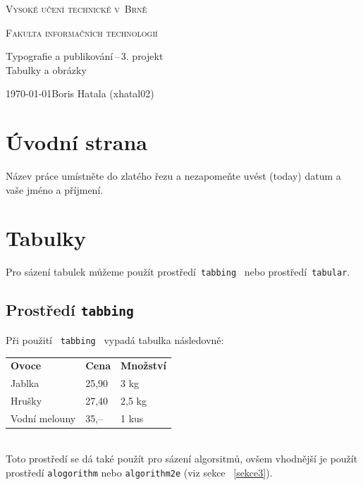 \documentclass[11pt, a4paper]{article}
\begin{document}
\begin{titlepage}
\thispagestyle{empty}

    \begin{center}

        {\Huge \textsc{Vysoké učení technické v~Brně \\[0.3em]}}

        {\huge \textsc{Fakulta informačních technologií}}


        {\LARGE{Typografie a publikování\,--\,3. projekt \\[0.3em]} 
        \Huge{Tabulky a obrázky} }


        {\Large \today \hfill Boris Hatala (xhatal02)}
    \end{center}

\end{titlepage}
\newpage

\section{Úvodní strana}
    Název práce umístněte do zlatého řezu a nezapomeňte uvést  (today) datum 
    a vaše jméno a příjmení.
\section{Tabulky}
    Pro sázení tabulek můžeme použít prostředí\, \verb|tabbing| \, nebo prostředí\, \verb|tabular|.
\subsection{Prostředí \texttt{tabbing}}
Při použití \, \verb|tabbing| \, vypadá tabulka následovně:
\begin{table}[h]
    \begin{tabular}{l l l}
        \textbf{Ovoce} & \textbf{Cena} & \textbf{Množství} \\
        Jablka & 25,90 & 3 kg \\
        Hrušky & 27,40 & 2,5 kg \\
        Vodní melouny & 35,-- & 1 kus
    \end{tabular}
\end{table}
\bigskip
\\
\noindent
Toto prostředí se dá také použít pro sázení algorsitmů, ovšem vhodnější je 
použít prostředí \verb|alogorithm| nebo \verb|algorithm2e| (viz sekce ~\ref{sekce3}).
\end{document}
